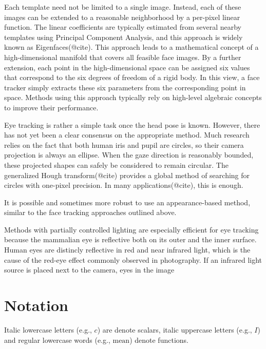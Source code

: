 Each template need not be limited to a single image.
Instead, each of these images can be extended to a reasonable neighborhood by a per-pixel linear function.
The linear coefficients are typically estimated from several nearby templates using Principal Component Analysis, and this approach is widely known as Eigenfaces(@cite).
This approach leads to a mathematical concept of a high-dimensional manifold that covers all feasible face images.
By a further extension, each point in the high-dimensional space can be assigned six values that correspond to the six degrees of freedom of a rigid body.
In this view, a face tracker simply extracts these six parameters from the corresponding point in space.
Methods using this approach typically rely on high-level algebraic concepts to improve their performance.

Eye tracking is rather a simple task once the head pose is known.
However, there has not yet been a clear consensus on the appropriate method.
Much research relies on the fact that both human iris and pupil are circles, so their camera projection is always an ellipse.
When the gaze direction is reasonably bounded, these projected shapes can safely be considered to remain circular.
The generalized Hough transform(@cite) provides a global method of searching for circles with one-pixel precision.
In many applications(@cite), this is enough.

It is possible and sometimes more robust to use an appearance-based method, similar to the face tracking approaches outlined above.
\todo{\dots}

\todo{\dots}
Methods with partially controlled lighting are especially efficient for eye tracking because the mammalian eye is reflective both on its outer and the inner surface.
Human eyes are distincly reflective in red and near infrared light, which is the cause of the red-eye effect commonly observed in photography.
If an infrared light source is placed next to the camera, eyes in the image




\section{Notation}

Italic lowercase letters (e.g., $c$) are denote scalars, italic uppercase letters (e.g., $I$) and regular lowercase words (e.g., $\mathrm{mean}$) denote functions.

